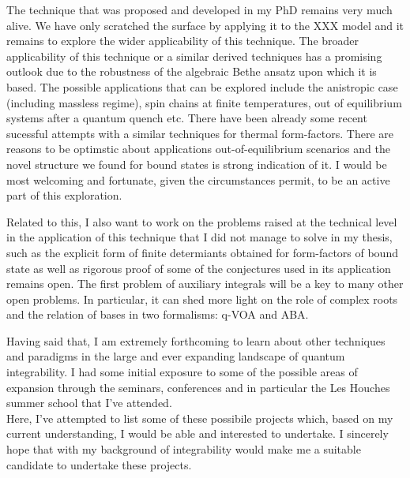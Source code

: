 \documentclass[a4paper, 12pt, DIV=13]{scrarticle}
\begin{document}
The technique that was proposed and developed in my PhD remains very much alive. We have only scratched the surface by applying it to the XXX model and it remains to explore the wider applicability of this technique.
The broader applicability of this technique or a similar derived techniques has a promising outlook due to the robustness of the algebraic Bethe ansatz upon which it is based.
The possible applications that can be explored include the anistropic case (including massless regime), spin chains at finite temperatures, out of equilibrium systems after a quantum quench etc.
There have been already some recent sucessful attempts with a similar techniques for thermal form-factors.
There are reasons to be optimstic about applications out-of-equilibrium scenarios and the novel structure we found for bound states is strong indication of it.
I would be most welcoming and fortunate, given the circumstances permit, to be an active part of this exploration.
\par
Related to this, I also want to work on the problems raised at the technical level in the application of this technique that I did not manage to solve in my thesis, such as the explicit form of finite determiants obtained for form-factors of bound state as well as rigorous proof of some of the conjectures used in its application remains open.
The first problem of auxiliary integrals will be a key to many other open problems. In particular, it can shed more light on the role of complex roots and the relation of bases in two formalisms: q-VOA and ABA.
\par
\vspace{.5em}
Having said that, I am extremely forthcoming to learn about other techniques and paradigms in the large and ever expanding landscape of quantum integrability.
I had some initial exposure to some of the possible areas of expansion through the seminars, conferences and in particular the Les Houches summer school that I've attended. 
\\
Here, I've attempted to list some of these possibile projects which, based on my current understanding, I would be able and interested to undertake.
I sincerely hope that with my background of integrability would make me a suitable candidate to undertake these projects.
\end{document}
